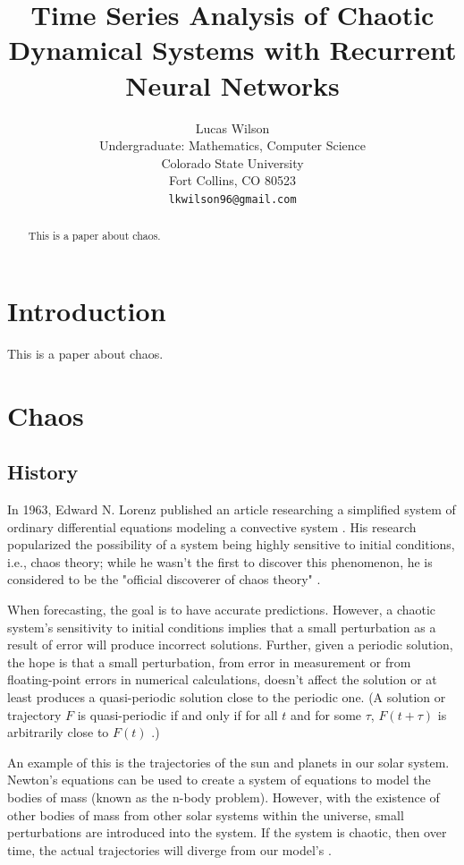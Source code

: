\documentclass{article}
\title{Time Series Analysis of Chaotic Dynamical Systems with Recurrent Neural Networks}
\author{
  Lucas Wilson \\
  Undergraduate: Mathematics, Computer Science \\
  Colorado State University\\
  Fort Collins, CO 80523 \\
  \texttt{lkwilson96@gmail.com} \\
}
\begin{document}
\maketitle

\begin{abstract}
This is a paper about chaos.
\end{abstract}

\section{Introduction}

This is a paper about chaos.

\section{Chaos}

\subsection{History}

In 1963, Edward N. Lorenz published an article researching a simplified
system of ordinary differential equations modeling a convective system
\cite{lorenz1963deterministic}. His research popularized the possibility of a
system being highly sensitive to initial conditions, i.e., chaos theory;
while he wasn't the first to discover this phenomenon, he is considered to be
the "official discoverer of chaos theory" \cite{oestreicher2007history}.

When forecasting, the goal is to have accurate predictions. However, a
chaotic system's sensitivity to initial conditions implies that a small
perturbation as a result of error will produce incorrect solutions. Further,
given a periodic solution, the hope is that a small perturbation, from error
in measurement or from floating-point errors in numerical calculations,
doesn't affect the solution or at least produces a quasi-periodic solution
close to the periodic one. (A solution or trajectory $F$ is quasi-periodic if
and only if for all $t$ and for some $\tau$, $F(t+\tau)$ is arbitrarily close
to $F(t)$ \cite{lorenz1963deterministic}.)

An example of this is the trajectories of the sun and planets in our solar
system. Newton's equations can be used to create a system of equations to
model the bodies of mass (known as the n-body problem). However, with the
existence of other bodies of mass from other solar systems within the
universe, small perturbations are introduced into the system. If the system
is chaotic, then over time, the actual trajectories will diverge from our
model's \cite{oestreicher2007history}.
\end{document}
